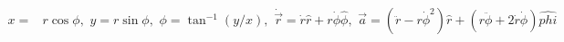 \documentclass[12pt, a4paper]{article}
\begin{document}
\begin{align*}
x =& r\cos\phi,  \,\, 
y = r\sin\phi, \,\, 
\phi = \tan^{-1}(y/x), \,\,
\dot{\vec{r}} = \dot{r}\hat{r} + r\dot{\phi}\hat{\phi}, \,\,
\vec{a} = (\ddot{r}-r\dot{\phi}^2)\hat{r}+(r\ddot{\phi}+2\dot{r}\dot{\phi})\hat{phi}
\end{align*}
\end{document}
